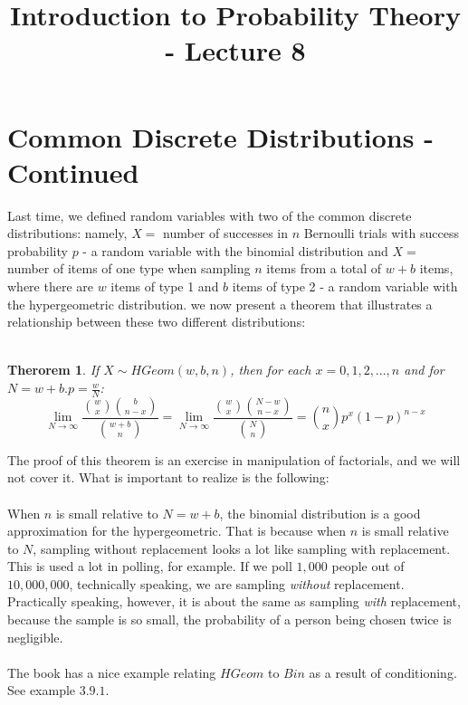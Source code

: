 \documentclass[12pt]{article} %
\title{Introduction to Probability Theory - Lecture 8}
\newtheorem{thm}{Therorem}
\begin{document}
\maketitle
\section{Common Discrete Distributions - Continued}
Last time, we defined random variables with two of the common discrete distributions: namely, $X =$ number of successes in $n$ Bernoulli trials with success probability $p$ - a random variable with the binomial distribution and $X = $ number of items of one type when sampling $n$ items from a total of $w+b$ items, where there are $w$ items of type 1 and $b$ items of type 2 - a random variable with the hypergeometric distribution. we now present a theorem that illustrates a relationship between these two different distributions:\\\\
\begin{thm}
If $X\sim HGeom(w,b,n)$, then for each $x=0,1,2,...,n$ and for $N=w+b. p=\frac{w}N$:
$$\lim\limits_{N\rightarrow\infty}\frac{{w\choose{x}}{{b\choose{n-x}}}}{{{w+b}\choose{n}}} = \lim\limits_{N\rightarrow\infty}\frac{{w\choose{x}}{{{N-w}\choose{n-x}}}}{{{N}\choose{n}}} = {n\choose{x}}p^x\left(1-p\right)^{n-x}$$
\end{thm}
The proof of this theorem is an exercise in manipulation of factorials, and we will not cover it. What is important to realize is the following:\\\\
When $n$ is small relative to $N=w+b$, the binomial distribution is a good approximation for the hypergeometric. That is because when $n$ is small relative to $N$, sampling without replacement looks a lot like sampling with replacement.  This is used a lot in polling, for example. If we poll $1,000$ people out of $10,000,000$, technically speaking, we are sampling \emph{without} replacement. Practically speaking, however, it is about the same as sampling \emph{with} replacement, because the sample is so small, the probability of a person being chosen twice is negligible.\\\\
The book has a nice example relating $HGeom$ to $Bin$ as a result of conditioning. See example $3.9.1$.
\end{document}
